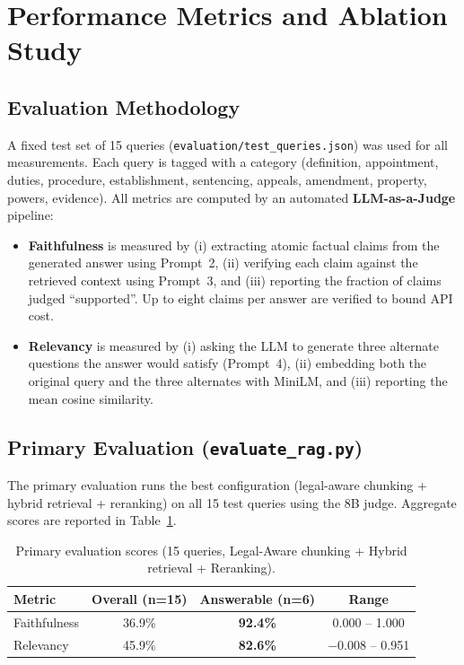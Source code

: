 \documentclass[11pt,a4paper]{article}
\begin{document}
\newpage
\section{Performance Metrics and Ablation Study}
\label{sec:metrics}

\subsection{Evaluation Methodology}

A fixed test set of 15 queries (\texttt{evaluation/test\_queries.json}) was used for all measurements. Each query is tagged with a category (definition, appointment, duties, procedure, establishment, sentencing, appeals, amendment, property, powers, evidence). All metrics are computed by an automated \textbf{LLM-as-a-Judge} pipeline:

\begin{itemize}[leftmargin=*]
    \item \textbf{Faithfulness} is measured by (i) extracting atomic factual claims from the generated answer using Prompt~2, (ii) verifying each claim against the retrieved context using Prompt~3, and (iii) reporting the fraction of claims judged ``supported''. Up to eight claims per answer are verified to bound API cost.
    \item \textbf{Relevancy} is measured by (i) asking the LLM to generate three alternate questions the answer would satisfy (Prompt~4), (ii) embedding both the original query and the three alternates with MiniLM, and (iii) reporting the mean cosine similarity.
\end{itemize}

\subsection{Primary Evaluation (\texttt{evaluate\_rag.py})}

The primary evaluation runs the best configuration (legal-aware chunking + hybrid retrieval + reranking) on all 15 test queries using the 8B judge. Aggregate scores are reported in Table~\ref{tab:primary}.

\begin{table}[H]
\centering
\footnotesize
\caption{Primary evaluation scores (15 queries, Legal-Aware chunking + Hybrid retrieval + Reranking).}
\label{tab:primary}
\renewcommand{\arraystretch}{1.2}
\begin{tabular}{lccc}
\toprule
\textbf{Metric} & \textbf{Overall (n=15)} & \textbf{Answerable (n=6)} & \textbf{Range} \\
\midrule
Faithfulness & 36.9\% & \textbf{92.4\%} & 0.000 -- 1.000 \\
Relevancy    & 45.9\% & \textbf{82.6\%} & $-0.008$ -- 0.951 \\
\bottomrule
\end{tabular}
\end{table}
\end{document}
